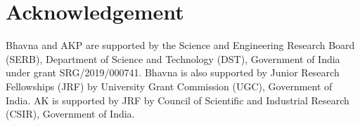 \documentclass[12pt]{amsart}    %
\newtheorem{corollary}[theorem]{Corollary}
\numberwithin{equation}{section}
\begin{document}

    

\section*{Acknowledgement}
Bhavna and AKP are supported by the Science and Engineering Research Board (SERB), Department of Science and Technology (DST), Government of India under grant 
SRG/2019/000741. Bhavna is also supported by Junior Research Fellowships (JRF) by University Grant Commission (UGC), Government of India. AK is supported by JRF  by Council of Scientific and Industrial Research (CSIR), Government of India.






\end{document}
